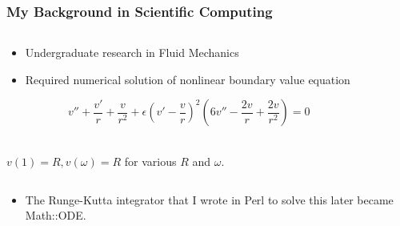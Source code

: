 \documentclass[12pt]{beamer}
\begin{document}
\begin{frame}[fragile]
    \frametitle{My Background in Scientific Computing}
    \begin{columns}[T]
        \begin{column}{5cm}
            \begin{tiny}
            \begin{itemize}
                \item Undergraduate research in Fluid Mechanics
                \item Required numerical solution of nonlinear boundary value equation
            \end{itemize}
                \end{tiny}
                \begin{equation*}
v'' + \frac{v'}{r} + \frac{v}{r^2} + 
\epsilon\left( v' - \frac{v}{r} \right)^2\left(6v'' - \frac{2v}{r} + \frac{2v}{r^2}\right) = 0
                \end{equation*}
                \\
                \begin{tiny}
                $ v(1) = R, v(\omega) = R $ for various $R$ and $\omega$.
                \end{tiny}
        \end{column}
        \begin{column}{5cm}
        \end{column}
    \end{columns}
    \begin{tiny}
    \begin{itemize}
    \item The Runge-Kutta integrator that I wrote in Perl to solve this later became Math::ODE.
    \end{itemize}
    \end{tiny}
\end{frame}
\end{document}
